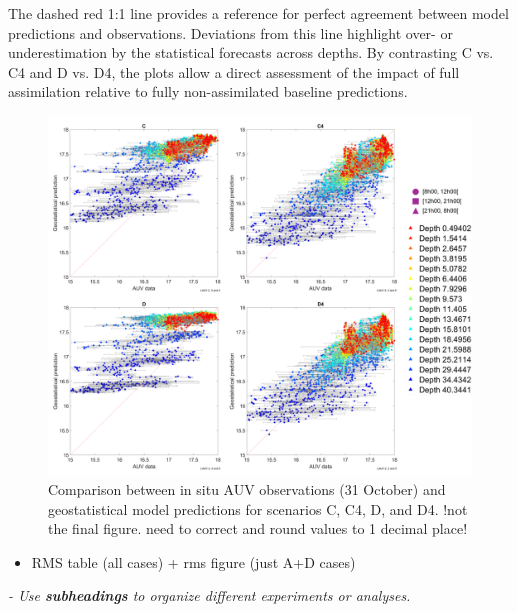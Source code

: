 The dashed red 1:1 line provides a reference for perfect agreement between model predictions and observations. Deviations from this line highlight over- or underestimation by the statistical forecasts across depths. By contrasting C vs. C4 and D vs. D4, the plots allow a direct assessment of the impact of full assimilation relative to fully non-assimilated baseline predictions.

\begin{figure}[!]
  \centering
  \includegraphics[scale=0.7]{fig/scatter.png}
  \caption{Comparison between in situ AUV observations (31 October) and geostatistical model predictions for scenarios C, C4, D, and D4. !not the final figure. need to correct and round values to 1 decimal place!}
  \label{fig:scatter}
\end{figure}



\begin{itemize}
    
    \item RMS table (all cases) + rms figure (just A+D cases)
\end{itemize}

 
\textit{- Use \textbf{subheadings} to organize different experiments or analyses.}
